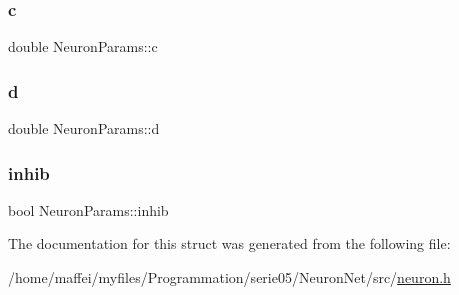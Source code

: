 \mbox{\label{structNeuronParams_a5df2ced2526eb84af2c8d2d34d9bfd93}} 
\subsubsection{\texorpdfstring{c}{c}}
{\footnotesize\ttfamily double Neuron\+Params\+::c}

\mbox{\label{structNeuronParams_af2bd3bad3bc5532186cdc8d056a10cfb}} 
\subsubsection{\texorpdfstring{d}{d}}
{\footnotesize\ttfamily double Neuron\+Params\+::d}

\mbox{\label{structNeuronParams_a751856d77a821cbd361b774d8653bbe6}} 
\subsubsection{\texorpdfstring{inhib}{inhib}}
{\footnotesize\ttfamily bool Neuron\+Params\+::inhib}



The documentation for this struct was generated from the following file\+:\begin{DoxyCompactItemize}
\item 
/home/maffei/myfiles/\+Programmation/serie05/\+Neuron\+Net/src/\hyperlink{neuron_8h}{neuron.\+h}\end{DoxyCompactItemize}
